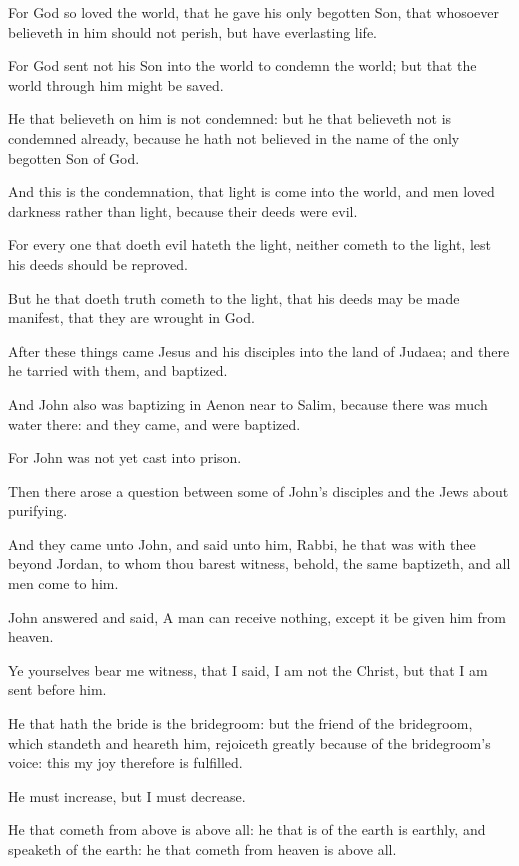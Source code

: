 \verse For God so loved the world, that he gave his only begotten Son, that whosoever believeth in him should not perish, but have everlasting life.

\verse For God sent not his Son into the world to condemn the world; but that the world through him might be saved.

\verse He that believeth on him is not condemned: but he that believeth not is condemned already, because he hath not believed in the name of the only begotten Son of God.

\verse And this is the condemnation, that light is come into the world, and men loved darkness rather than light, because their deeds were evil.

\verse For every one that doeth evil hateth the light, neither cometh to the light, lest his deeds should be reproved.

\verse But he that doeth truth cometh to the light, that his deeds may be made manifest, that they are wrought in God.

\verse After these things came Jesus and his disciples into the land of Judaea; and there he tarried with them, and baptized.

\verse And John also was baptizing in Aenon near to Salim, because there was much water there: and they came, and were baptized.

\verse For John was not yet cast into prison.

\verse Then there arose a question between some of John's disciples and the Jews about purifying.

\verse And they came unto John, and said unto him, Rabbi, he that was with thee beyond Jordan, to whom thou barest witness, behold, the same baptizeth, and all men come to him.

\verse John answered and said, A man can receive nothing, except it be given him from heaven.

\verse Ye yourselves bear me witness, that I said, I am not the Christ, but that I am sent before him.

\verse He that hath the bride is the bridegroom: but the friend of the bridegroom, which standeth and heareth him, rejoiceth greatly because of the bridegroom's voice: this my joy therefore is fulfilled.

\verse He must increase, but I must decrease.

\verse He that cometh from above is above all: he that is of the earth is earthly, and speaketh of the earth: he that cometh from heaven is above all.

